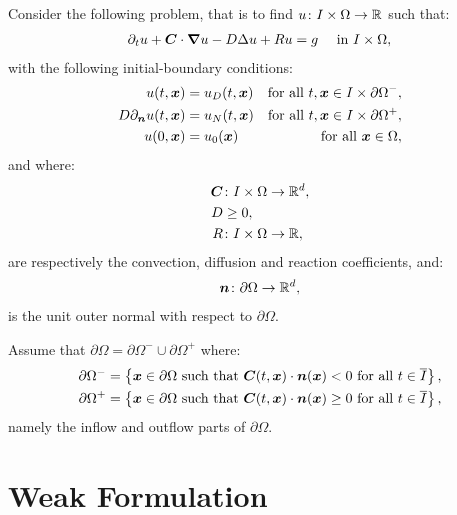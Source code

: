 Consider the following problem, that is to find $u \colon I \times \Omega \rightarrow \mathbb{R}$ such that:
\begin{align}
    \partial_t u + \bm{C} \cdot \bm{\nabla} u - D \Delta u + R u &= g &\text{ in } I \times \Omega, \label{equation:cdr}
\end{align}
with the following initial-boundary conditions:
\begin{align}
    u(t, \bm{x}) &= u_D(t, \bm{x}) &\text{for all } t, \bm{x} \in I \times \partial \Omega^-, \label{equation:cdr_dirichlet} \\
    D \partial_{\bm{n}} u(t, \bm{x}) &= u_N(t, \bm{x}) &\text{for all } t, \bm{x} \in I \times \partial \Omega^+, \label{equation:cdr_neumann} \\
    u(0, \bm{x}) &= u_0(\bm{x}) &\text{for all } \bm{x} \in \Omega, \label{equation:cdr_initial}
\end{align}
and where:
\begin{align}
    \bm{C} & \colon I \times \Omega \rightarrow \mathbb{R}^{d}, \\
    D & \geq 0, \\
    R & \colon I \times \Omega \rightarrow \mathbb{R},
\end{align}
are respectively the convection, diffusion and reaction coefficients, and:
\begin{align}
    \bm{n} \colon \partial \Omega \rightarrow \mathbb{R}^{d},
\end{align}
is the unit outer normal with respect to $\partial \Omega$.

Assume that $\partial \Omega = \partial \Omega^- \cup \partial \Omega^+$ where:
\begin{align}
    \partial \Omega^- = \left\{ \bm{x} \in \partial \Omega \text{ such that } \bm{C}(t, \bm{x}) \cdot \bm{n}(\bm{x}) < 0 \text{ for all } t \in \overline{I} \right\}, \\
    \partial \Omega^+ = \left\{ \bm{x} \in \partial \Omega \text{ such that } \bm{C}(t, \bm{x}) \cdot \bm{n}(\bm{x}) \geq 0 \text{ for all } t \in \overline{I} \right\},
\end{align}
namely the inflow and outflow parts of $\partial \Omega$.

\newpage
\section{Weak Formulation} \label{sec:cdr_weak}

